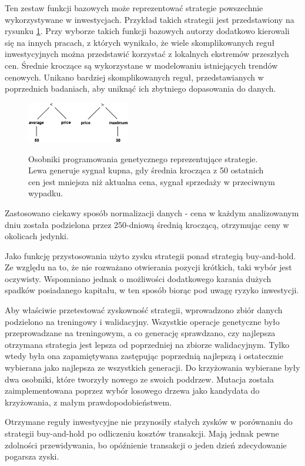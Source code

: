 \documentclass[twoside]{iisthesis}
\begin{document}
Ten zestaw funkcji bazowych może reprezentować strategie powszechnie wykorzystywane w inwestycjach. Przykład takich strategii jest przedstawiony na rysunku \ref{fig:allenProste}. Przy wyborze takich funkcji bazowych autorzy dodatkowo kierowali się na innych pracach, z których wynikało, że wiele skomplikowanych reguł inwestycyjnych można przedstawić korzystać z lokalnych ekstremów przeszłych cen. Średnie kroczące są wykorzystane w modelowaniu istniejących trendów cenowych. Unikano bardziej skomplikowanych reguł, przedstawianych w poprzednich badaniach, aby uniknąć ich zbytniego dopasowania do danych.

\begin{figure}[h]
\center
\includegraphics[width=0.4\textwidth]{AllenProste.jpg}
\label{fig:allenProste}
\caption{Osobniki programowania genetycznego reprezentujące strategie. Lewa generuje sygnał kupna, gdy średnia krocząca z 50 ostatnich cen jest mniejsza niż aktualna cena, sygnał sprzedaży w przeciwnym wypadku.}
\end{figure}

Zastosowano ciekawy sposób normalizacji danych - cena w każdym analizowanym dniu została podzielona przez 250-dniową średnią kroczącą, otrzymując ceny w okolicach jedynki. 

Jako funkcję przystosowania użyto zysku strategii ponad strategią buy-and-hold. Ze względu na to, że nie rozważano otwierania pozycji krótkich, taki wybór jest oczywisty. Wspomniano jednak o możliwości dodatkowego karania dużych spadków posiadanego kapitału, w ten sposób biorąc pod uwagę ryzyko inwestycji.

Aby właściwie przetestować zyskowność strategii, wprowadzono zbiór danych podzielono na treningowy i walidacyjny. Wszystkie operacje genetyczne było przeprowadzane na treningowym, a co generację sprawdzano, czy najlepsza otrzymana strategia jest lepsza od poprzedniej na zbiorze walidacyjnym. Tylko wtedy była ona zapamiętywana zastępując poprzednią najlepszą i ostatecznie wybierana jako najlepsza ze wszystkich generacji. Do krzyżowania wybierane były dwa osobniki, które tworzyły nowego ze swoich poddrzew. Mutacja została zaimplementowana poprzez wybór losowego drzewa jako kandydata do krzyżowania, z małym prawdopodobieństwem.

Otrzymane reguły inwestycyjne nie przynosiły stałych zysków w porównaniu do strategii buy-and-hold po odliczeniu kosztów transakcji. Mają jednak pewne zdolności przewidywania, bo opóźnienie transakcji o jeden dzień zdecydowanie pogarsza zyski.
\end{document}
